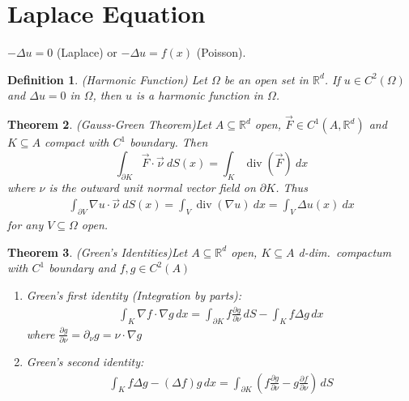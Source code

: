 \documentclass{report}
\theoremstyle{tommy}
\newtheorem{defn}{Definition}
\newtheorem{thm}[defn]{Theorem}
\renewcommand\div{\operatorname{div}}
\begin{document}
  \section{Laplace Equation}
  \(- \Delta u = 0\) (Laplace) or \(-\Delta u = f(x)\) (Poisson).

  \begin{defn} (Harmonic Function)
    Let \(\Omega\) be an open set in \(\mathbb{R}^d\). If \(u \in C^2(\Omega)\) and \(\Delta u = 0\) in \(\Omega\), then \(u\) is a harmonic function in \(\Omega\).
  \end{defn}

  \begin{thm} (Gauss-Green Theorem)\label{gauss-green}
    Let \(A \subseteq \mathbb{R}^d\) open, \(\vec{F} \in C^1(A, \mathbb{R}^d)\) and \(K \subseteq A\) compact with \(C^1\) boundary. Then
    \[ \int_{\partial K} \vec{F} \cdot \vec{\nu}\ dS(x) = \int_K \div(\vec{F})\ dx \]
    where \(\nu\) is the outward unit normal vector field on \(\partial K\).
  Thus
  \begin{align*}
    \int_{\partial V} \nabla u \cdot \vec{\nu}\ dS(x)
    = \int_V \div(\nabla u) \ dx
    = \int_V \Delta u(x) \ dx
  \end{align*}
  for any \(V \subseteq \Omega \) open.
  \end{thm}


  \begin{thm} (Green's Identities)\label{green-identities}
    Let \(A \subseteq \mathbb{R}^d\) open, \(K \subseteq A\) d-dim.\ compactum with \(C^1\) boundary and \(f, g \in C^2(A)\)
    \begin{enumerate}
      \item Green's first identity (Integration by parts): \begin{align*}
        \int_K \nabla f \cdot \nabla g \, dx = \int_{\partial K} f \frac{\partial g}{\partial \nu} \, dS - \int_K f \Delta g \, dx
      \end{align*}
      where \(\frac{\partial g}{\partial \nu} = \partial_\nu g = \nu \cdot \nabla g\)
      \item Green's second identity: \begin{align*}
        \int_K f \Delta g - (\Delta f) g \, dx = \int_{\partial K} \left(f \frac{\partial g}{\partial \nu} - g \frac{\partial f}{\partial \nu}\right) \, dS
      \end{align*}
    \end{enumerate}
  \end{thm}
\end{document}
